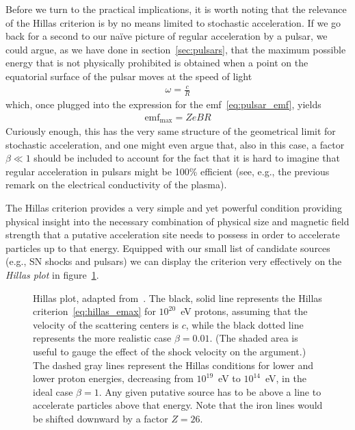 Before we turn to the practical implications, it is worth noting that the relevance of
the Hillas criterion is by no means limited to stochastic acceleration. If we go back
for a second to our na\"ive picture of regular acceleration by a pulsar, we could
argue, as we have done in section~\ref{sec:pulsars}, that the maximum possible energy
that is not physically prohibited is obtained when a point on the equatorial surface
of the pulsar moves at the speed of light
\begin{align*}
  \omega = \frac{c}{R}
\end{align*}
which, once plugged into the expression for the emf~\eqref{eq:pulsar_emf}, yields
\begin{align*}
  \text{emf}_\text{max} = Ze B R
\end{align*}
Curiously enough, this has the very same structure of the geometrical limit for
stochastic acceleration, and one might even argue that, also in this case, a factor
$\beta \ll 1$ should be included to account for the fact that it is hard to imagine that
regular acceleration in pulsars might be 100\% efficient (see, e.g., the previous remark
on the electrical conductivity of the plasma).

The Hillas criterion provides a very simple and yet powerful condition providing
physical insight into the necessary combination of physical size and magnetic field
strength that a putative acceleration site needs to possess in order to accelerate
particles up to that energy. Equipped with our small list of candidate sources
(e.g., SN shocks and pulsars) we can display the criterion very effectively on the
\emph{Hillas plot} in figure~\ref{fig:hillas_plot}.

\begin{figure}[!htbp]
  
  \caption{Hillas plot, adapted from~\cite{1984ARA&A..22..425H}. The black, solid
  line represents the Hillas criterion~\eqref{eq:hillas_emax} for $10^{20}$~eV protons,
  assuming that the velocity of the scattering centers is $c$, while the black dotted
  line represents the more realistic case $\beta = 0.01$. (The shaded area is useful
  to gauge the effect of the shock velocity on the argument.) The dashed gray lines
  represent the Hillas conditions for lower and lower proton energies, decreasing from
  $10^{19}$~eV to $10^{14}$~eV, in the ideal case $\beta = 1$. Any given putative
  source has to be above a line to accelerate particles above that energy. Note
  that the iron lines would be shifted downward by a factor $Z = 26$.}
  \label{fig:hillas_plot}
\end{figure}

